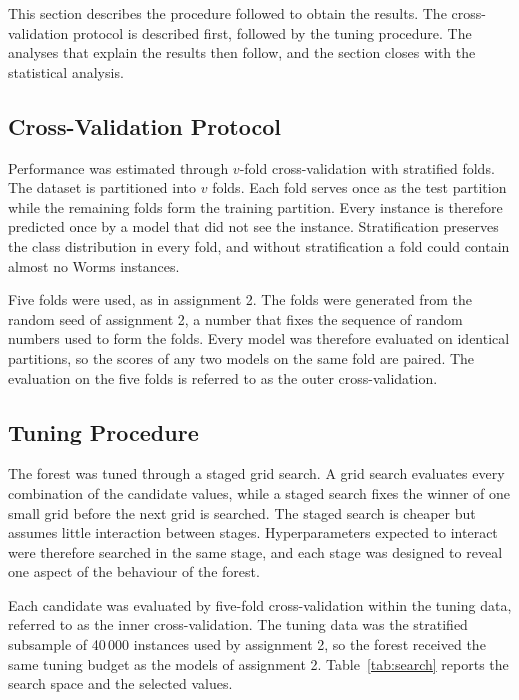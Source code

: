 \documentclass[conference]{IEEEtran}
\begin{document}
This section describes the procedure followed to obtain the results. The
cross-validation protocol is described first, followed by the tuning procedure. The
analyses that explain the results then follow, and the section closes with the
statistical analysis.

\subsection{Cross-Validation Protocol}

Performance was estimated through $v$-fold cross-validation \cite{hastie2009}
with stratified folds. The dataset is partitioned into $v$ folds. Each fold serves once
as the test partition while the remaining folds form the training partition.
Every instance is therefore predicted once by a model that did not see the
instance. Stratification preserves the class distribution in every fold, and
without stratification a fold could contain almost no Worms instances.

Five folds were used, as in assignment 2. The folds were generated from the random
seed of assignment 2, a number that fixes the sequence of random numbers used to
form the folds. Every model was therefore evaluated on identical partitions, so
the scores of any two models on the same fold are paired. The evaluation on the
five folds is referred to as the outer cross-validation.

\subsection{Tuning Procedure}

The forest was tuned through a staged grid search. A grid search evaluates every
combination of the candidate values, while a staged search fixes the winner of one
small grid before the next grid is searched. The staged search is cheaper but
assumes little interaction between stages. Hyperparameters expected to interact
were therefore searched in the same stage, and each stage was designed to reveal one
aspect of the behaviour of the forest.

Each candidate was evaluated by five-fold cross-validation within the tuning data,
referred to as the inner cross-validation. The tuning data was the stratified
subsample of 40\,000 instances used by assignment 2, so the forest received the same
tuning budget as the models of assignment 2. Table~\ref{tab:search} reports the
search space and the selected values.
\end{document}
